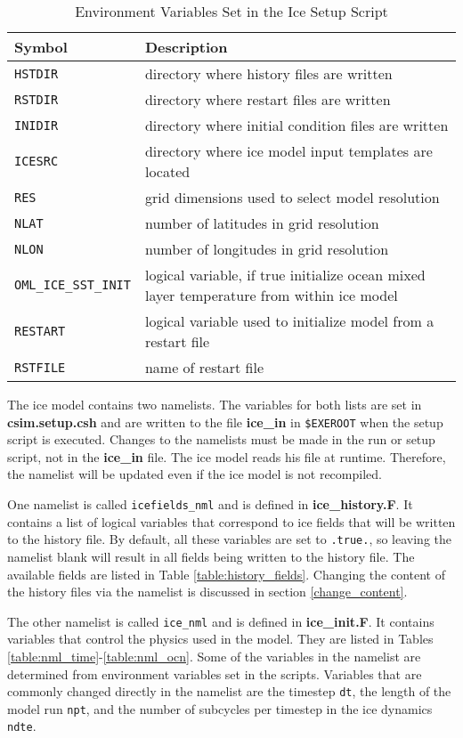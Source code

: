 \begin{table}
  \begin{center}
  \caption{Environment Variables Set in the Ice Setup Script}
  \label{table:environ_var}
  \begin{tabular}{p{4cm}p{10cm}} \hline

  Symbol              & Description    \\ \hline \hline
   {\tt HSTDIR} & directory where history files are written  \\
   {\tt RSTDIR} & directory where restart files are written  \\
   {\tt INIDIR} & directory where initial condition files are written  \\
   {\tt ICESRC} & directory where ice model input templates are located  \\
   {\tt RES}    & grid dimensions used to select model resolution  \\
   {\tt NLAT}   & number of latitudes in grid resolution \\
   {\tt NLON}   & number of longitudes in grid resolution \\
   {\tt OML\_ICE\_SST\_INIT}  & logical variable, if true initialize ocean mixed layer
                          temperature from within ice model\\
   {\tt RESTART} & logical variable used to initialize model from a restart file \\
   {\tt RSTFILE} & name of restart file \\
  \hline
  \end{tabular}
  \end{center}
\end{table}

The ice model contains two namelists.  The variables for both
lists are set in {\bf csim.setup.csh} and are written to the file {\bf ice\_in}
in {\tt \$EXEROOT} when the setup script is executed.  Changes to the
namelists must be made in the run or setup script, not in the {\bf ice\_in}
file.  The ice model reads his file at runtime.  Therefore, the namelist
will be updated even if the ice model is not recompiled.

One namelist is called {\tt icefields\_nml} and is defined in
{\bf  ice\_history.F}.  It contains a list of logical variables that
correspond to ice fields that will be written to the history file.  By
default, all these variables are set to {\tt .true.}, so leaving the namelist
blank will result in all fields being written to the history file.
The available fields are listed in Table \ref{table:history_fields}. Changing
the content of the history files via the namelist is discussed in section
\ref{change_content}.

The other namelist is called {\tt ice\_nml} and is defined in
{\bf ice\_init.F}. It contains variables that control the physics used in
the model.  They are listed in Tables \ref{table:nml_time}-\ref{table:nml_ocn}.
Some of the variables in the namelist are determined from environment variables
set in the scripts.  Variables that are commonly changed directly in the
namelist are the timestep {\tt dt}, the length of the model run {\tt npt}, and
the number of subcycles per timestep in the ice dynamics {\tt ndte}.

